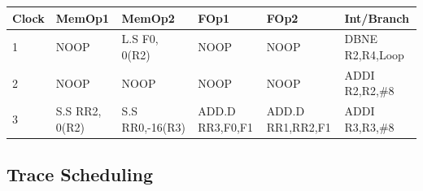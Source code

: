 \documentclass{beamer}
\begin{document}
\begin{frame}[fragile,t]
\smallskip

\begin{tiny}
\begin{tabular}{llllll}
\hline
Clock   & MemOp1         & MemOp2         & FOp1            & FOp2             & Int/Branch \\\hline
1       & NOOP           & L.S F0, 0(R2)  & NOOP            & NOOP             & DBNE R2,R4,Loop \\
2       & NOOP           & NOOP           & NOOP            & NOOP             & ADDI R2,R2,\#8  \\
3       & S.S RR2, 0(R2) & S.S RR0,-16(R3)& ADD.D RR3,F0,F1 & ADD.D RR1,RR2,F1 & ADDI R3,R3,\#8 \\\hline
\end{tabular}
\end{tiny}

\end{frame}


\subsection{Trace Scheduling}
\end{document}
